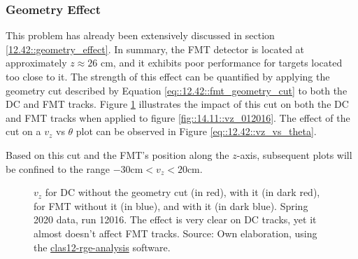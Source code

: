 \subsubsection{Geometry Effect}
\label{14.12::geometry_effect}
    This problem has already been extensively discussed in section \ref{12.42::geometry_effect}.
    In summary, the FMT detector is located at approximately $z \approx 26$ cm, and it exhibits poor performance for targets located too close to it.
    The strength of this effect can be quantified by applying the geometry cut described by Equation \eqref{eq::12.42::fmt_geometry_cut} to both the DC and FMT tracks.
    Figure \ref{fig::14.12::vz_012016_geomcut} illustrates the impact of this cut on both the DC and FMT tracks when applied to figure \ref{fig::14.11::vz_012016}.
    The effect of the cut on a $v_z$ vs $\theta$ plot can be observed in Figure \ref{eq::12.42::vz_vs_theta}.

    Based on this cut and the FMT's position along the $z$-axis, subsequent plots will be confined to the range $-30 \text{cm} < v_z < 20 \text{cm}$.

    \begin{figure}[h!]
        \centering{}
        \caption[$v_z$ for DC and FMT, w/ and w/out the geometry cut, run 12016]{$v_z$ for DC without the geometry cut (in red), with it (in dark red), for FMT without it (in blue), and with it (in dark blue).
        Spring 2020 data, run 12016.
        The effect is very clear on DC tracks, yet it almost doesn't affect FMT tracks.
        Source: Own elaboration, using the \hyperlink{github.com/bleaktwig/clas12-rge-analysis}{clas12-rge-analysis} software.}
        \label{fig::14.12::vz_012016_geomcut}
    \end{figure}
